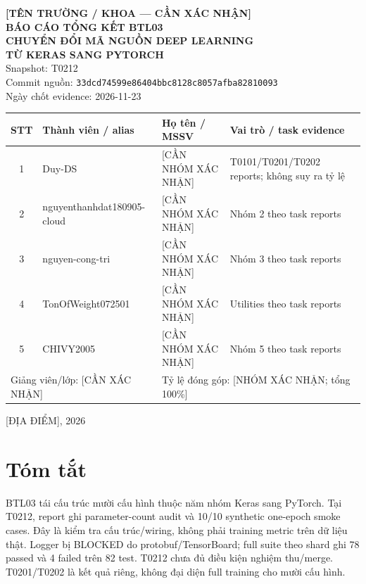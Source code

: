 \begin{titlepage}
\thispagestyle{empty}
\begin{center}
\vspace*{1.4cm}
{\Large\bfseries [TÊN TRƯỜNG / KHOA — CẦN XÁC NHẬN]}\\[1.5cm]
{\Large\bfseries BÁO CÁO TỔNG KẾT BTL03}\\[0.6cm]
{\LARGE\bfseries CHUYỂN ĐỔI MÃ NGUỒN DEEP LEARNING\\ TỪ KERAS SANG PYTORCH}\\[0.8cm]
Snapshot: T0212\\
Commit nguồn: \texttt{33dcd74599e86404bbc8128c8057afba82810093}\\
Ngày chốt evidence: 2026-11-23

\vfill
\begin{tabularx}{\textwidth}{c p{} p{} X}
\toprule
STT & Thành viên / alias & Họ tên / MSSV & Vai trò / task evidence \\
\midrule
1 & Duy-DS & [CẦN NHÓM XÁC NHẬN] & T0101/T0201/T0202 reports; không suy ra tỷ lệ \\
2 & nguyenthanhdat180905-cloud & [CẦN NHÓM XÁC NHẬN] & Nhóm 2 theo task reports \\
3 & nguyen-cong-tri & [CẦN NHÓM XÁC NHẬN] & Nhóm 3 theo task reports \\
4 & TonOfWeight072501 & [CẦN NHÓM XÁC NHẬN] & Utilities theo task reports \\
5 & CHIVY2005 & [CẦN NHÓM XÁC NHẬN] & Nhóm 5 theo task reports \\
\midrule
\multicolumn{2}{l}{Giảng viên/lớp: [CẦN XÁC NHẬN]} & \multicolumn{2}{l}{Tỷ lệ đóng góp: [NHÓM XÁC NHẬN; tổng 100\%]} \\
\bottomrule
\end{tabularx}
\vfill
[ĐỊA ĐIỂM], 2026
\end{center}
\end{titlepage}

\chapter*{Tóm tắt}
BTL03 tái cấu trúc mười cấu hình thuộc năm nhóm Keras sang PyTorch. Tại T0212, report ghi parameter-count audit và 10/10 synthetic one-epoch smoke cases. Đây là kiểm tra cấu trúc/wiring, không phải training metric trên dữ liệu thật. Logger bị BLOCKED do protobuf/TensorBoard; full suite theo shard ghi 78 passed và 4 failed trên 82 test. T0212 chưa đủ điều kiện nghiệm thu/merge. T0201/T0202 là kết quả riêng, không đại diện full training cho mười cấu hình.

